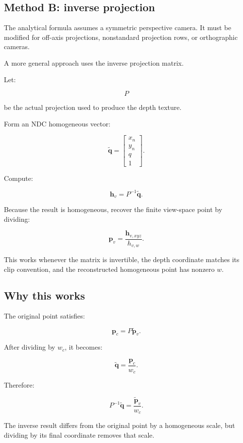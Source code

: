 \subsection{Method B: inverse projection}\label{02-foundations-ii-ch035-method-b-inverse-projection}

The analytical formula assumes a symmetric perspective camera. It must be modified for off-axis projections, nonstandard projection rows, or orthographic cameras.

A more general approach uses the inverse projection matrix.

Let:

\[ P \]

be the actual projection used to produce the depth texture.

Form an NDC homogeneous vector:

\[ \tilde{\mathbf q}= \begin{bmatrix} x_n\\y_n\\q\\1 \end{bmatrix}. \]

Compute:

\[ \boxed{ \mathbf h_v=P^{-1}\tilde{\mathbf q}. } \]

Because the result is homogeneous, recover the finite view-space point by dividing:

\[ \boxed{ \mathbf p_v=\frac{\mathbf h_{v,xyz}}{h_{v,w}}. } \]

This works whenever the matrix is invertible, the depth coordinate matches its clip convention, and the reconstructed homogeneous point has nonzero \(w\).

\subsection{Why this works}\label{02-foundations-ii-ch035-why-this-works}

The original point satisfies:

\[ \mathbf p_c=P\tilde{\mathbf p}_v. \]

After dividing by \(w_c\), it becomes:

\[ \tilde{\mathbf q} = \frac{\mathbf p_c}{w_c}. \]

Therefore:

\[ P^{-1}\tilde{\mathbf q} = \frac{\tilde{\mathbf p}_v}{w_c}. \]

The inverse result differs from the original point by a homogeneous scale, but dividing by its final coordinate removes that scale.

